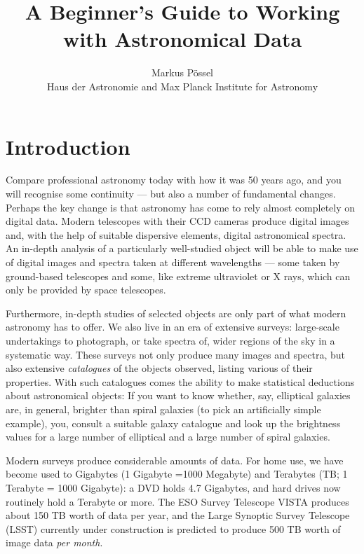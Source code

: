 \documentclass[twocolumn,apj]{openjournal}
\begin{document}
\title{\bf A Beginner's Guide to Working with Astronomical Data}
\author{Markus P{\"o}ssel\\ \small Haus der Astronomie and Max Planck Institute for Astronomy}

\maketitle

{\small

\tableofcontents
}

\section{Introduction}

Compare professional astronomy today with how it was 50 years ago, and you will recognise some continuity --- but also a number of fundamental changes. Perhaps the key change is that astronomy has come to rely almost completely on digital data. Modern telescopes with their CCD cameras produce digital images and, with the help of suitable dispersive elements, digital astronomical spectra. An in-depth analysis of a particularly well-studied object will be able to make use of digital images and spectra taken at different wavelengths --- some taken by ground-based telescopes and some, like extreme ultraviolet or X rays, which can only be provided by space telescopes.

Furthermore, in-depth studies of selected objects are only part of what modern astronomy has to offer. We also live in an era of extensive surveys: large-scale undertakings to photograph, or take spectra of, wider regions of the sky in a systematic way. These surveys not only produce many images and spectra, but also extensive {\em catalogues} of the objects observed, listing various of their properties. With such catalogues comes the ability to make statistical deductions about astronomical objects: If you want to know whether, say, elliptical galaxies are, in general, brighter than spiral galaxies (to pick an artificially simple example), you, consult a suitable galaxy catalogue and look up the brightness values for a large number of elliptical and a large number of spiral galaxies. 

Modern surveys produce considerable amounts of data. For home use, we have become used to Gigabytes (1 Gigabyte =1000 Megabyte) and Terabytes (TB; 1 Terabyte = 1000 Gigabyte): a DVD holds 4.7 Gigabytes, and hard drives now routinely hold a Terabyte or more. The ESO Survey Telescope VISTA produces about 150 TB worth of data per year, and the Large Synoptic Survey Telescope (LSST) currently under construction is predicted to produce 500 TB worth of image data {\em per month}.
\end{document}
